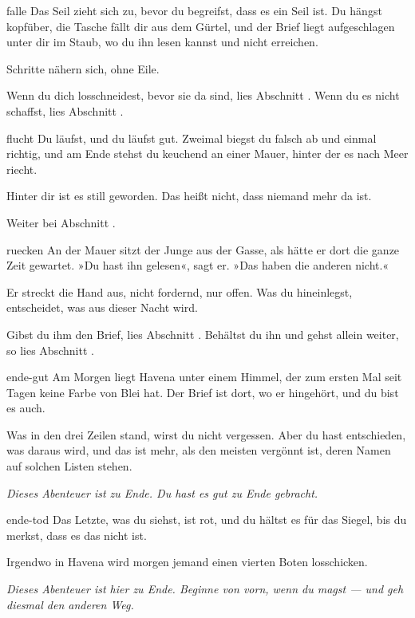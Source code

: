 \begin{soloBlock}{falle}
Das Seil zieht sich zu, bevor du begreifst, dass es ein Seil ist. Du hängst kopfüber,
die Tasche fällt dir aus dem Gürtel, und der Brief liegt aufgeschlagen unter dir im
Staub, wo du ihn lesen kannst und nicht erreichen.

Schritte nähern sich, ohne Eile.

Wenn du dich losschneidest, bevor sie da sind, lies Abschnitt .
Wenn du es nicht schaffst, lies Abschnitt .
\end{soloBlock}

\begin{soloBlock}{flucht}
Du läufst, und du läufst gut. Zweimal biegst du falsch ab und einmal richtig, und
am Ende stehst du keuchend an einer Mauer, hinter der es nach Meer riecht.

Hinter dir ist es still geworden. Das heißt nicht, dass niemand mehr da ist.

Weiter bei Abschnitt .
\end{soloBlock}

\begin{soloBlock}[zusammen]{ruecken}
An der Mauer sitzt der Junge aus der Gasse, als hätte er dort die ganze Zeit
gewartet. »Du hast ihn gelesen«, sagt er. »Das haben die anderen nicht.«

Er streckt die Hand aus, nicht fordernd, nur offen. Was du hineinlegst, entscheidet,
was aus dieser Nacht wird.

Gibst du ihm den Brief, lies Abschnitt . Behältst du ihn und
gehst allein weiter, so lies Abschnitt .
\end{soloBlock}

\begin{soloBlock}{ende-gut}
Am Morgen liegt Havena unter einem Himmel, der zum ersten Mal seit Tagen keine Farbe
von Blei hat. Der Brief ist dort, wo er hingehört, und du bist es auch.

Was in den drei Zeilen stand, wirst du nicht vergessen. Aber du hast entschieden,
was daraus wird, und das ist mehr, als den meisten vergönnt ist, deren Namen auf
solchen Listen stehen.

\emph{Dieses Abenteuer ist zu Ende. Du hast es gut zu Ende gebracht.}
\soloEnde
\end{soloBlock}

\begin{soloBlock}{ende-tod}
Das Letzte, was du siehst, ist rot, und du hältst es für das Siegel, bis du merkst,
dass es das nicht ist.

Irgendwo in Havena wird morgen jemand einen vierten Boten losschicken.

\emph{Dieses Abenteuer ist hier zu Ende. Beginne von vorn, wenn du magst — und geh
diesmal den anderen Weg.}
\soloEnde
\end{soloBlock}

